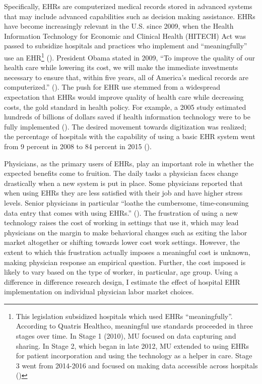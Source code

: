 \documentclass[12pt]{article}
\begin{document}
Specifically, EHRs are computerized medical records stored in advanced systems that may include advanced capabilities such as decision making assistance. EHRs have become increasingly relevant in the U.S. since 2009, when the Health Information Technology for Economic and Clinical Health (HITECH) Act was passed to subsidize hospitals and practices who implement and ``meaningfully'' use an EHR\footnote{This legislation subsidized hospitals which used EHRs “meaningfully”. According to Quatris Healthco, meaningful use standards proceeded in three stages over time. In Stage 1 (2010), MU focused on data capturing and sharing. In Stage 2, which began in late 2012, MU extended to using EHRs for patient incorporation and using the technology as a helper in care. Stage 3 went from 2014-2016 and focused on making data accessible across hospitals (\cite{meanuse})} (\cite{hitech}). President Obama stated in 2009, “To improve the quality of our health care while lowering its cost, we will make the immediate investments necessary to ensure that, within five years, all of America’s medical records are computerized.” (\cite{presquote}). The push for EHR use stemmed from a widespread expectation that EHRs would improve quality of health care while decreasing costs, the gold standard in health policy. For example, a 2005 study estimated hundreds of billions of dollars saved if health information technology were to be fully implemented (\cite{hillestad2005}). The desired movement towards digitization was realized; the percentage of hospitals with the capability of using a basic EHR system went from 9 percent in 2008 to 84 percent in 2015 (\cite{stats}).

Physicians, as the primary users of EHRs, play an important role in whether the expected benefits come to fruition. The daily tasks a physician faces change drastically when a new system is put in place. Some physicians reported that when using EHRs they are less satisfied with their job and have higher stress levels. Senior physicians in particular “loathe the cumbersome, time-consuming data entry that comes with using EHRs.” (\cite{CollierBurnout}). The frustration of using a new technology raises the cost of working in settings that use it, which may lead physicians on the margin to make behavioral changes such as exiting the labor market altogether or shifting towards lower cost work settings. However, the extent to which this frustration actually imposes a meaningful cost is unknown, making physician response an empirical question. Further, the cost imposed is likely to vary based on the type of worker, in particular, age group. Using a difference in difference research design, I estimate the effect of hospital EHR implementation on individual physician labor market choices.
\end{document}
